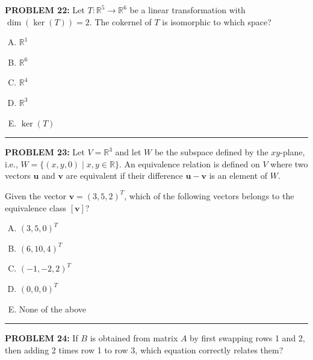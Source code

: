 \documentclass[12pt]{amsart}
\newcommand{\divider}{
  \vspace{-1em} %
  \noindent
  \raisebox{-0.15ex}{\textbullet}%
  \hspace{0.5em}%
  \rule[0.5ex]{0.95\textwidth}{1.0pt}%
  \hspace{0.5em}%
  \raisebox{-0.15ex}{\textbullet}%
  \vspace{0em} %
}
\begin{document}
{\bf PROBLEM 22:}
Let $T: \mathbb{R}^5 \to \mathbb{R}^6$ be a linear transformation with $\dim(\ker(T)) = 2$. The cokernel of $T$ is isomorphic to which space?

\begin{enumerate}[(A)]
\item $\mathbb{R}^1$ 
\item $\mathbb{R}^6$ 
\item $\mathbb{R}^4$ 
\item $\mathbb{R}^3$
\item $\ker(T)$
\end{enumerate}
\divider


\newpage



{\bf PROBLEM 23:}
Let $V = \mathbb{R}^3$ and let $W$ be the subspace defined by the $xy$-plane, i.e., $W = \{(x, y, 0) \mid x, y \in \mathbb{R}\}$. An equivalence relation is defined on $V$ where two vectors $\mathbf{u}$ and $\mathbf{v}$ are equivalent if their difference $\mathbf{u - v}$ is an element of $W$.

Given the vector $\mathbf{v} = (3, 5, 2)^T$, which of the following vectors belongs to the equivalence class $[\mathbf{v}]$?

\begin{enumerate}[(A)]
\item $(3, 5, 0)^T$
\item $(6, 10, 4)^T$
\item $(-1, -2, 2)^T$
\item $(0, 0, 0)^T$
\item None of the above
\end{enumerate}
\divider



{\bf PROBLEM 24:}
If $B$ is obtained from matrix $A$ by first swapping rows 1 and 2, then adding 2 times row 1 to row 3, which equation correctly relates them?
\end{document}
